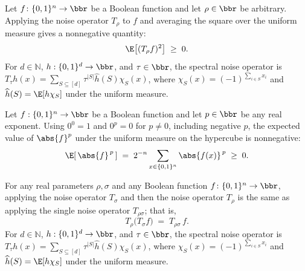 \begin{lemma}
\leanok
{}
\label{BooleanAnalysis.Hypercontractivity.expect_sq_noiseOp_nonneg}
Let $f\colon\{0,1\}^n\to\bbr$ be a Boolean function and let $\rho\in\bbr$ be arbitrary.
Applying the noise operator $T_\rho$ to $f$ and averaging the square over the uniform
measure gives a nonnegative quantity:
\[
  \E\!\left[(T_\rho f)^2\right]\;\ge\;0.
\] For $d\in\mathbb N$, $h:\{0,1\}^d\to\bbr$, and $\tau\in\bbr$, the spectral noise
operator is $T_\tau h(x)=\sum_{S\subseteq[d]}\tau^{|S|}\widehat h(S)\chi_S(x)$, where
$\chi_S(x)=(-1)^{\sum_{i\in S}x_i}$ and $\widehat h(S)=\E[h\chi_S]$ under the uniform
measure.
\end{lemma}

\begin{lemma}
\leanok
{}
\label{BooleanAnalysis.Hypercontractivity.expect_rpow_abs_nonneg}
Let $f:\{0,1\}^n\to\bbr$ be a Boolean function and let $p\in\bbr$ be any real exponent.
Using $0^0=1$ and $0^p=0$ for $p\ne0$, including negative $p$,
the expected value of $\abs{f}^p$ under the uniform measure on the hypercube is
nonnegative:
\[
\E\!\left[\,\abs{f}^{\,p}\,\right]\;=\;2^{-n}\sum_{x\in\{0,1\}^n}\abs{f(x)}^{\,p}\;\ge\;0.
\]
\end{lemma}

\begin{lemma}
\leanok
{}
\label{BooleanAnalysis.Hypercontractivity.noiseOp_compose}
For any real parameters $\rho,\sigma$ and any Boolean function
$f\colon\{0,1\}^n\to\bbr$, applying the noise operator $T_\sigma$ and then the noise
operator $T_\rho$ is the same as applying the single noise operator $T_{\rho\sigma}$;
that is,
\[
  T_\rho\bigl(T_\sigma f\bigr) \;=\; T_{\rho\sigma}\,f .
\] For $d\in\mathbb N$, $h:\{0,1\}^d\to\bbr$, and $\tau\in\bbr$, the spectral noise
operator is $T_\tau h(x)=\sum_{S\subseteq[d]}\tau^{|S|}\widehat h(S)\chi_S(x)$, where
$\chi_S(x)=(-1)^{\sum_{i\in S}x_i}$ and $\widehat h(S)=\E[h\chi_S]$ under the uniform
measure.
\end{lemma}

